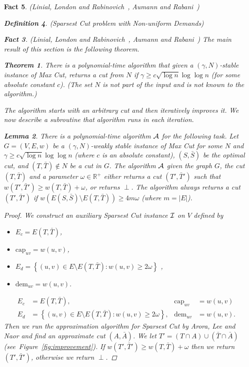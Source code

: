 \documentclass[twoside,leqno,twocolumn]{article}
\newcommand {\set}   [1] {\left\{ #1 \right\}}
\newtheorem{theorem}{Theorem}[section]
\newtheorem{lemma}[theorem]{Lemma}
\newtheorem{Definition}[theorem]{Definition}
\newtheorem{fact}[theorem]{Fact}
\newcommand{\N}{N}
\begin{document}
\begin{fact}{\sc (Linial, London and Rabinovich~\cite{LLR}, Aumann and Rabani~\cite{AR})}
\begin{Definition} {\sc (Sparsest Cut problem with Non-uniform Demands)}
\begin{fact}{\sc (Linial, London and Rabinovich~\cite{LLR}, Aumann and Rabani~\cite{AR})}
The main result of this section is the following theorem.
\begin{theorem}\label{thm:weakly-stable}
There is a polynomial-time algorithm that given a $(\gamma, N)$-stable instance of Max Cut, returns a cut from $N$ if $\gamma \geq c\sqrt{\log n}\log \log n$ (for some absolute constant $c$).
(The set $N$ is not part of the input and is not known to the algorithm.)
\end{theorem}

The algorithm starts with an arbitrary cut and then iteratively improves it. We now describe a subroutine that algorithm runs in each iteration.

\begin{lemma}\label{lem:cut-improvement}
There is a polynomial-time algorithm $\cal A$ for the following task.
Let $G=(V,E,w)$ be a $(\gamma, \N)$-weakly stable instance of Max Cut for some $N$ and $\gamma \geq c\sqrt{\log n}\log\log n$ (where $c$ is an absolute constant), $(S,\bar S)$ be the optimal cut, and $(T,\bar T)\notin \N$ be a cut in $G$. 
The algorithm $\cal A$ given the graph $G$, the cut $(T,\bar T)$ and a parameter $\omega \in {\mathbb R}^+$  
either returns a cut $(T', \bar T')$ such that $w(T',\bar T') \geq w(T,\bar T) + \omega$, or returns $\perp$.
The algorithm always returns a cut $(T', \bar T')$ if $w(E(S,\bar S) \setminus E(T,\bar T)) \geq 4m\omega$ (where $m= |E|$). 
\end{lemma}
\begin{proof}
We construct an auxiliary Sparsest Cut instance $\cal I$ on $V$ defined by
\ifSODA
\begin{itemize}
\item $E_c = E(T,\bar T)$, \item $ \mathrm{cap}_{uv} = w(u,v)$,
\item $E_d = \set{(u,v) \in E\setminus E(T,\bar T):  w(u,v) \geq 2\omega}$ , \item $ \mathrm{dem}_{uv} = w(u,v)$.
\end{itemize}
\else
\begin{align*}
E_c &= E(T,\bar T) , & \mathrm{cap}_{uv} &= w(u,v)\\
E_d &= \set{(u,v) \in E\setminus E(T,\bar T):  w(u,v) \geq 2\omega} , & \mathrm{dem}_{uv} &= w(u,v).
\end{align*}
\fi
Then we run the approximation algorithm for Sparsest Cut by Arora, Lee and Naor and find an approximate cut $(A, \bar A)$.
We let $T' = (T \cap A) \cup (\bar T \cap \bar A)$ (see~Figure~\ref{fig:improvement}). If $w(T',\bar T') \geq w(T,\bar T) + \omega$ then we return $(T', \bar T')$,
otherwise we return $\perp$. 


\end{proof}
\end{fact}
\end{Definition}
\end{fact}
\end{document}
